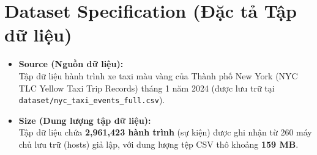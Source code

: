\documentclass[12pt,a4paper]{article}
\begin{document}
\section{Dataset Specification (Đặc tả Tập dữ liệu)}
\begin{itemize}[leftmargin=*]
    \item \textbf{Source (Nguồn dữ liệu):} \\
    Tập dữ liệu hành trình xe taxi màu vàng của Thành phố New York (NYC TLC Yellow Taxi Trip Records) tháng 1 năm 2024 (được lưu trữ tại \texttt{dataset/nyc\_taxi\_events\_full.csv}).
    
    \item \textbf{Size (Dung lượng tập dữ liệu):} \\
    Tập dữ liệu chứa \textbf{2,961,423 hành trình} (sự kiện) được ghi nhận từ 260 máy chủ lưu trữ (hosts) giả lập, với dung lượng tệp CSV thô khoảng \textbf{159 MB}.


\end{itemize}
\end{document}
